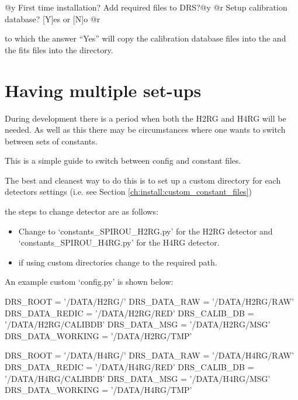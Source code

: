 \begin{cmdboxprintspecial}
@y		First time installation?
		Add required files to DRS?@y
@r			Setup calibration database? [Y]es or [N]o @r
\end{cmdboxprintspecial}

\noindent to which the answer ``Yes'' will copy the calibration database files into the \masterCALIBDBfile and the fits files into the  directory.


\ifdevguide
\clearpage
\newpage
\section{Having multiple set-ups}
\label{ch:install:detect_setup}

\noindent During development there is a period when both the H2RG and H4RG will be needed. As well as this there may be circumstances where one wants to switch between sets of constants. 

\noindent This is a simple guide to switch between config and constant files.

\begin{note}
The best and cleanest way to do this is to set up a custom directory for each detectors settings (i.e. see Section \ref{ch:install:custom_constant_files})
\end{note}

\noindent the steps to change detector are as follows:
\begin{itemize}
	\item Change  to `constants\_SPIROU\_H2RG.py' for the H2RG detector and `constants\_SPIROU\_H4RG.py' for the H4RG detector.

	\item if using custom directories change  to the required path.
\end{itemize}

An example custom `config.py' is shown below:

\begin{textbox}[title={In "/home/user/spirouH2RG/config.py"}]
DRS_ROOT = '/DATA/H2RG/'
DRS_DATA_RAW = '/DATA/H2RG/RAW'
DRS_DATA_REDIC = '/DATA/H2RG/RED'
DRS_CALIB_DB = '/DATA/H2RG/CALIBDB'
DRS_DATA_MSG = '/DATA/H2RG/MSG'
DRS_DATA_WORKING = '/DATA/H2RG/TMP'
\end{textbox}

\begin{textbox}[title={In "/home/user/spirouH4RG/config.py"}]
DRS_ROOT = '/DATA/H4RG/'
DRS_DATA_RAW = '/DATA/H4RG/RAW'
DRS_DATA_REDIC = '/DATA/H4RG/RED'
DRS_CALIB_DB = '/DATA/H4RG/CALIBDB'
DRS_DATA_MSG = '/DATA/H4RG/MSG'
DRS_DATA_WORKING = '/DATA/H4RG/TMP'
\end{textbox}

\fi